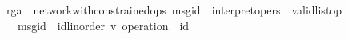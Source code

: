 \vspace{0.35em}
\begin{isabellebody}
\ \ \ \ \ \ \ \ \ rga\ {\isacharequal}\ network{\isacharunderscore}with{\isacharunderscore}constrained{\isacharunderscore}ops\ msg{\isacharunderscore}id\ {\isacharunderscore}\ interpret{\isacharunderscore}opers\ {\isachardoublequoteopen}{\isacharbrackleft}{\isacharbrackright}{\isachardoublequoteclose}\ {\isachardoublequoteopen}valid{\isacharunderscore}list{\isacharunderscore}op{\isachardoublequoteclose}\isanewline
\ \ \ \ \ \ \ \ \ \ \ msg{\isacharunderscore}id\ {\isacharcolon}{\isacharcolon}\ {\isachardoublequoteopen}{\isacharparenleft}{\isacharprime}id{\isacharcolon}{\isacharcolon}linorder{\isacharcomma}\ {\isacharprime}v{\isacharparenright}\ operation\ {\isasymRightarrow}\ {\isacharprime}id{\isachardoublequoteclose}
\end{isabellebody}
\vspace{0.35em}

